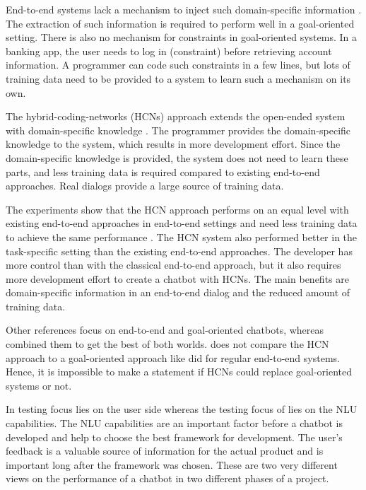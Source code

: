 End-to-end systems lack a mechanism to inject such domain-specific information \cite{williams2017hybrid}.
The extraction of such information is required to perform well in a goal-oriented setting.
There is also no mechanism for constraints in goal-oriented systems.
In a banking app, the user needs to log in (constraint) before retrieving account information.
A programmer can code such constraints in a few lines, but lots of training data need to be provided to a system to learn such a mechanism on its own.

The hybrid-coding-networks (HCNs) approach extends the open-ended system with domain-specific knowledge \cite{williams2017hybrid}. 
The programmer provides the domain-specific knowledge to the system, which results in more development effort.
Since the domain-specific knowledge is provided, the system does not need to learn these parts, and less training data is required compared to existing end-to-end approaches.
Real dialogs provide a large source of training data.

The experiments show that the HCN approach performs on an equal level with existing end-to-end approaches in end-to-end settings and need less training data to achieve the same performance \cite{williams2017hybrid}. 
The HCN system also performed better in the task-specific setting than the existing end-to-end approaches.
The developer has more control than with the classical end-to-end approach, but it also requires more development effort to create a chatbot with HCNs.
The main benefits are domain-specific information in an end-to-end dialog and the reduced amount of training data.

Other references focus on end-to-end and goal-oriented chatbots, whereas \citet{williams2017hybrid} combined them to get the best of both worlds.
\citet{williams2017hybrid} does not compare the HCN approach to a goal-oriented approach like \citet{bordes2016learning} did for regular end-to-end systems.
Hence, it is impossible to make a statement if HCNs could replace goal-oriented systems or not.

In \citet{evaluateChatbotsShawar2007} testing focus lies on the user side whereas the testing focus of \citet{braunEvaluatingNLU} lies on the NLU capabilities.
The NLU capabilities are an important factor before a chatbot is developed and help to choose the best framework for development.
The user's feedback is a valuable source of information for the actual product and is important long after the framework was chosen.
These are two very different views on the performance of a chatbot in two different phases of a project.


